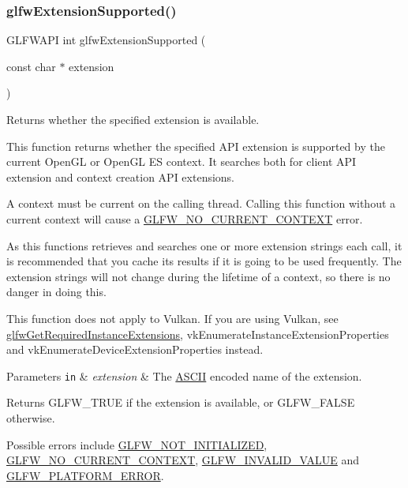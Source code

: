 \subsubsection{\texorpdfstring{glfw\+Extension\+Supported()}{glfwExtensionSupported()}}
{\footnotesize\ttfamily G\+L\+F\+W\+A\+PI int glfw\+Extension\+Supported (\begin{DoxyParamCaption}\item[{const char $\ast$}]{extension }\end{DoxyParamCaption})}



Returns whether the specified extension is available. 

This function returns whether the specified A\+PI extension is supported by the current Open\+GL or Open\+GL ES context. It searches both for client A\+PI extension and context creation A\+PI extensions.

A context must be current on the calling thread. Calling this function without a current context will cause a \hyperlink{group__errors_gaa8290386e9528ccb9e42a3a4e16fc0d0}{G\+L\+F\+W\+\_\+\+N\+O\+\_\+\+C\+U\+R\+R\+E\+N\+T\+\_\+\+C\+O\+N\+T\+E\+XT} error.

As this functions retrieves and searches one or more extension strings each call, it is recommended that you cache its results if it is going to be used frequently. The extension strings will not change during the lifetime of a context, so there is no danger in doing this.

This function does not apply to Vulkan. If you are using Vulkan, see \hyperlink{group__vulkan_gada152edc5bbbd0c2138728878632fd9c}{glfw\+Get\+Required\+Instance\+Extensions}, {\ttfamily vk\+Enumerate\+Instance\+Extension\+Properties} and {\ttfamily vk\+Enumerate\+Device\+Extension\+Properties} instead.


\begin{DoxyParams}[1]{Parameters}
\mbox{\tt in}  & {\em extension} & The \hyperlink{structASCII}{A\+S\+C\+II} encoded name of the extension. \\
\hline
\end{DoxyParams}
\begin{DoxyReturn}{Returns}
{\ttfamily G\+L\+F\+W\+\_\+\+T\+R\+UE} if the extension is available, or {\ttfamily G\+L\+F\+W\+\_\+\+F\+A\+L\+SE} otherwise.
\end{DoxyReturn}
Possible errors include \hyperlink{group__errors_ga2374ee02c177f12e1fa76ff3ed15e14a}{G\+L\+F\+W\+\_\+\+N\+O\+T\+\_\+\+I\+N\+I\+T\+I\+A\+L\+I\+Z\+ED}, \hyperlink{group__errors_gaa8290386e9528ccb9e42a3a4e16fc0d0}{G\+L\+F\+W\+\_\+\+N\+O\+\_\+\+C\+U\+R\+R\+E\+N\+T\+\_\+\+C\+O\+N\+T\+E\+XT}, \hyperlink{group__errors_gaaf2ef9aa8202c2b82ac2d921e554c687}{G\+L\+F\+W\+\_\+\+I\+N\+V\+A\+L\+I\+D\+\_\+\+V\+A\+L\+UE} and \hyperlink{group__errors_gad44162d78100ea5e87cdd38426b8c7a1}{G\+L\+F\+W\+\_\+\+P\+L\+A\+T\+F\+O\+R\+M\+\_\+\+E\+R\+R\+OR}.

